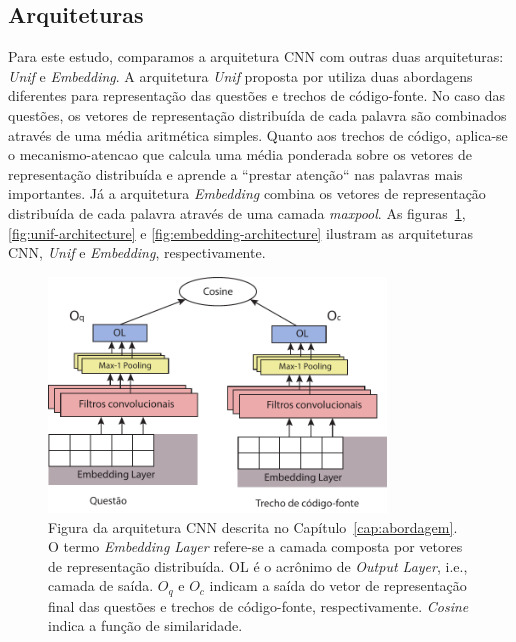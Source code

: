 \subsection{Arquiteturas}

Para este estudo, comparamos a arquitetura CNN com outras duas arquiteturas: \textit{Unif} e \textit{Embedding}. A arquitetura \textit{Unif} proposta por \cite{cambronero-deep-learning-code-search:2019} utiliza duas abordagens diferentes para representação das questões e trechos de código-fonte. No caso das questões, os vetores de representação distribuída de cada palavra são combinados através de uma média aritmética simples. Quanto aos trechos de código, aplica-se o \gls{mecanismo-atencao} que calcula uma média ponderada sobre os vetores de representação distribuída e aprende a ``prestar atenção`` nas palavras mais importantes.  Já a arquitetura \textit{Embedding} combina os vetores de representação distribuída de cada palavra através de uma camada \textit{maxpool}. As figuras~\ref{fig:cnn-architecture}, \ref{fig:unif-architecture} e \ref{fig:embedding-architecture} ilustram as arquiteturas CNN, \textit{Unif} e \textit{Embedding}, respectivamente.
\begin{figure}[h]
    \centering
    \includegraphics[width=0.8\textwidth]{figuras/cap-experimento/cnn-architecture-proposal.pdf}
    \caption{Figura da arquitetura CNN descrita no Capítulo~\ref{cap:abordagem}. O termo \emph{Embedding Layer} refere-se a camada composta por vetores de representação distribuída. OL é o acrônimo de \emph{Output Layer}, i.e., camada de saída. $O_{q}$ e $O_{c}$ indicam a saída do vetor de representação final das questões e trechos de código-fonte, respectivamente. \emph{Cosine} indica a função de similaridade.}
    \label{fig:cnn-architecture}
\end{figure}

